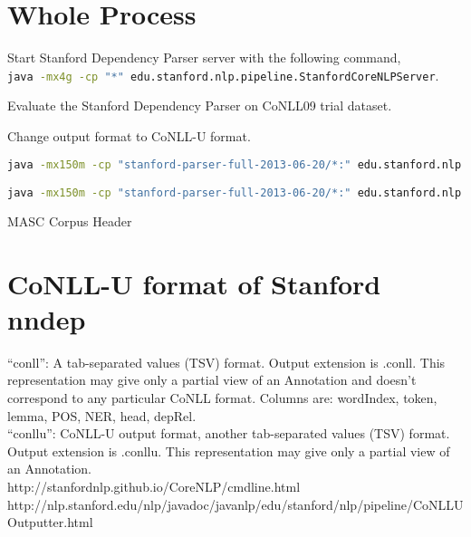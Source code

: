 \documentclass[letterpaper]{article}
\begin{document}
\begin{appendices}


\section{Whole Process}
Start Stanford Dependency Parser server with the following command, \\
\lstinline [language=bash]{java -mx4g -cp "*" edu.stanford.nlp.pipeline.StanfordCoreNLPServer}.

Evaluate the Stanford Dependency Parser on CoNLL09 trial dataset.

Change output format to CoNLL-U format.
\newcommand{\echo}[0]{echo}
\begin{lstlisting}[breaklines=true,language=bash]
java -mx150m -cp "stanford-parser-full-2013-06-20/*:" edu.stanford.nlp.parser.lexparser.LexicalizedParser -outputFormat "penn" edu/stanford/nlp/models/lexparser/englishPCFG.ser.gz stanford-parser-full-2013-06-20/data/testsent.txt >testsent.tree

java -mx150m -cp "stanford-parser-full-2013-06-20/*:" edu.stanford.nlp.trees.EnglishGrammaticalStructure -treeFile testsent.tree -conllx


\end{lstlisting}

MASC Corpus Header

\section{CoNLL-U format of Stanford nndep}
“conll”: A tab-separated values (TSV) format. Output extension is .conll. This representation may give only a partial view of an Annotation and doesn’t correspond to any particular CoNLL format. Columns are: wordIndex, token, lemma, POS, NER, head, depRel. \\

\bigskip
“conllu”: CoNLL-U output format, another tab-separated values (TSV) format. Output extension is .conllu. This representation may give only a partial view of an Annotation.\\

http://stanfordnlp.github.io/CoreNLP/cmdline.html\\

\bigskip
http://nlp.stanford.edu/nlp/javadoc/javanlp/edu/stanford/nlp/pipeline/CoNLLUOutputter.html


\end{appendices}
\end{document}
